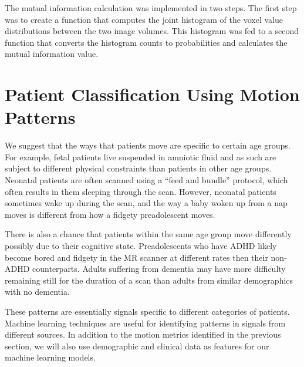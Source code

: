 The mutual information calculation was implemented in two steps. The first step was to create a function that computes the joint histogram of the voxel value distributions between the two image volumes. This histogram was fed to a second function that converts the histogram counts to probabilities and calculates the mutual information value. 


\section{Patient Classification Using Motion Patterns} 


We suggest that the ways that patients move are specific to certain age groups. For example, fetal patients live suspended in amniotic fluid and as such are subject to different physical constraints than patients in other age groups. Neonatal patients are often scanned using a ``feed and bundle'' protocol, which often results in them sleeping through the scan. However, neonatal patients sometimes wake up during the scan, and the way a baby woken up from a nap moves is different from how a fidgety preadolescent moves. %

There is also a chance that patients within the same age group move differently possibly due to their cognitive state. Preadolescents who have ADHD likely become bored and fidgety in the MR scanner at different rates then their non-ADHD counterparts. Adults suffering from dementia may have more difficulty remaining still for the duration of a scan than adults from similar demographics with no dementia.

These patterns are essentially signals specific to different categories of patients. Machine learning techniques are useful for identifying patterns in signals from different sources. In addition to the motion metrics identified in the previous section, we will also use demographic and clinical data as features for our machine learning models. 

